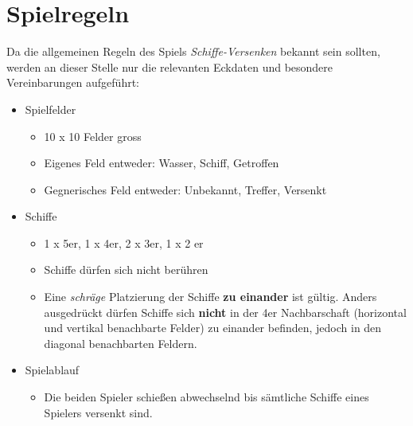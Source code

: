 \section{Spielregeln}
\label{sec:Spielregeln}

Da die allgemeinen Regeln des Spiels \textit{Schiffe-Versenken} bekannt sein sollten, werden an dieser Stelle nur die relevanten Eckdaten 
und besondere Vereinbarungen aufgeführt:


\begin{itemize}
	\item Spielfelder
		\begin{itemize}
			\item 10 x 10 Felder gross
			\item Eigenes Feld entweder: Wasser, Schiff, Getroffen
			\item Gegnerisches Feld entweder: Unbekannt, Treffer, Versenkt
		\end{itemize}
	\item Schiffe
		\begin{itemize}
			\item 1 x 5er, 1 x 4er, 2 x 3er, 1 x 2 er
			\item Schiffe dürfen sich nicht berühren
			\item Eine \textit{schräge} Platzierung der Schiffe \textbf{zu einander} ist gültig. Anders ausgedrückt dürfen Schiffe sich \textbf{nicht} in
				der 4er Nachbarschaft (horizontal und vertikal benachbarte Felder) zu einander befinden, jedoch in den diagonal benachbarten Feldern.
		\end{itemize}
	\item Spielablauf
		\begin{itemize}
			\item Die beiden Spieler schießen abwechselnd bis sämtliche Schiffe eines Spielers versenkt sind.
		\end{itemize}
	
\end{itemize}